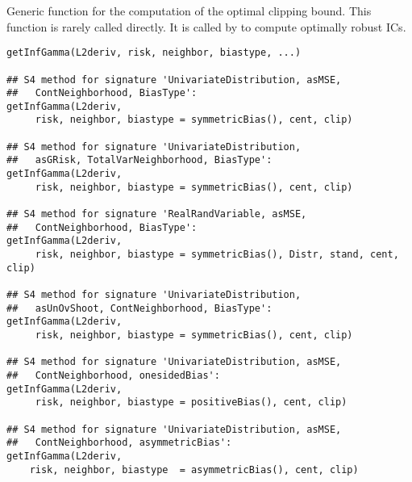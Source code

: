 \begin{Description}\relax
Generic function for the computation of the optimal clipping bound.
This function is rarely called directly. It is called by  
to compute optimally robust ICs.
\end{Description}
\begin{Usage}
\begin{verbatim}
getInfGamma(L2deriv, risk, neighbor, biastype, ...)

## S4 method for signature 'UnivariateDistribution, asMSE,
##   ContNeighborhood, BiasType':
getInfGamma(L2deriv, 
     risk, neighbor, biastype = symmetricBias(), cent, clip)

## S4 method for signature 'UnivariateDistribution,
##   asGRisk, TotalVarNeighborhood, BiasType':
getInfGamma(L2deriv, 
     risk, neighbor, biastype = symmetricBias(), cent, clip)

## S4 method for signature 'RealRandVariable, asMSE,
##   ContNeighborhood, BiasType':
getInfGamma(L2deriv, 
     risk, neighbor, biastype = symmetricBias(), Distr, stand, cent, clip)

## S4 method for signature 'UnivariateDistribution,
##   asUnOvShoot, ContNeighborhood, BiasType':
getInfGamma(L2deriv, 
     risk, neighbor, biastype = symmetricBias(), cent, clip)

## S4 method for signature 'UnivariateDistribution, asMSE,
##   ContNeighborhood, onesidedBias':
getInfGamma(L2deriv, 
     risk, neighbor, biastype = positiveBias(), cent, clip)

## S4 method for signature 'UnivariateDistribution, asMSE,
##   ContNeighborhood, asymmetricBias':
getInfGamma(L2deriv, 
    risk, neighbor, biastype  = asymmetricBias(), cent, clip)
\end{verbatim}
\end{Usage}

